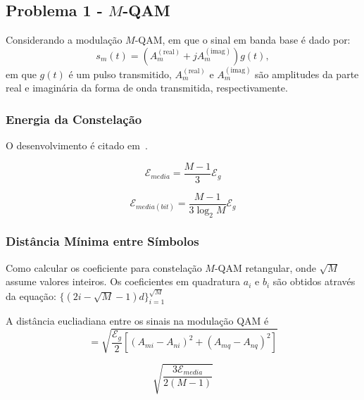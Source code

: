 \subsection{Problema 1 - \texorpdfstring{$M$}{M}-QAM}

Considerando a modulação $M$-QAM, em que o sinal em banda base é dado por:
$$s_m(t) = ( A_m^{(\text{real})} + j A_m^{(\text{imag})}) g(t) ,$$
em que $g(t)$ é um pulso transmitido, $A_m^{(\text{real})}$ e $A_m^{(\text{imag})}$ são amplitudes da parte real e imaginária da forma de onda transmitida, respectivamente.




\subsubsection{Energia da Constelação} 

O desenvolvimento é citado em~\cite{Proakis, Cecilio}.

$$ \mathcal{E}_{media} = \frac{M-1}{3} \mathcal{E}_g$$

$$ \mathcal{E}_{media(bit)} = \frac{M-1}{3\log_2 M} \mathcal{E}_g $$
\subsubsection{Distância Mínima entre Símbolos}

Como calcular os coeficiente para constelação $M$-QAM retangular, onde $\sqrt{M}$ assume valores inteiros. Os coeficientes em quadratura $a_i$ e $b_i$ são obtidos através da equação: $\{ (2i -\sqrt{M} - 1)d \}_{i=1}^{\sqrt{M}} $ 

A distância eucliadiana entre os sinais na modulação QAM é
$$ = \sqrt{\frac{\mathcal{E}_g}{2}[(A_{mi} - A_{ni})^2 + (A_{mq} - A_{nq})^2]}$$

$$\sqrt{\frac{3 \mathcal{E}_{media}}{2(M-1)}} $$

